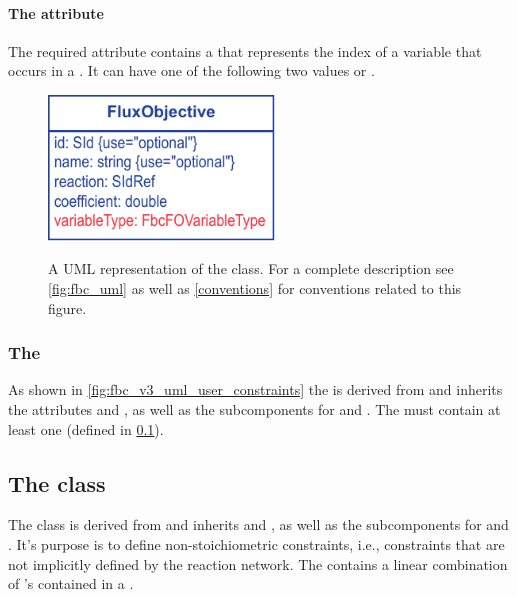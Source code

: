 \paragraph{The  attribute}
The required  attribute contains a  that
represents the index of a variable that occurs in a \FluxObjective. It can have one
of the following two values  or .
%
\begin{figure}[ht]
  \centering
  \includegraphics[width=6cm]{images/fbc_v3_uml_fobj.pdf}\\
  \caption{A UML representation of the \FBCPackage \FluxObjective class. For a complete description see \ref{fig:fbc_uml} as well as \ref{conventions} for conventions related to this figure.}
  \label{fig:fbc_uml_userconstraint}
\end{figure}

\subsubsection{The \FBC {}}
\label{listofuserconstraints-class}

As shown in \ref{fig:fbc_v3_uml_user_constraints} the \ListOfUserConstraints is derived from \SBase
and inherits the attributes  and , as well as
the subcomponents for \Annotation and \Notes. The
\ListOfUserConstraints must contain at least one \UserConstraint (defined in
\ref{userconstraint-class}).

\subsection{The \FBC {} class}
\label{userconstraint-class}

The \FBC \UserConstraint class is derived from \SBML \SBase and inherits
 and , as well as the subcomponents for
\Annotation and \Notes. It's purpose is to define non-stoichiometric constraints, i.e., constraints that are not implicitly defined by the reaction network. The \UserConstraint contains a linear combination of \UserConstraintComponent's contained in a \ListOfUserConstraintComponents.

